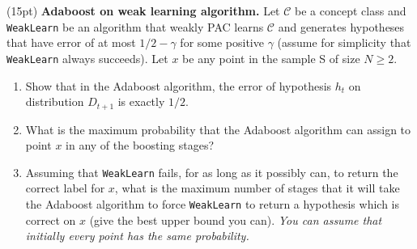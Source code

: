 \documentclass[11pt]{article}
\newcommand*{\C}{{\mathcal C}}
\DeclareMathOperator{\1}{\mathbbm{1}}
\begin{document}

\begin{problem}(15pt) \textbf{Adaboost on weak learning algorithm.}  
Let $\C$ be a concept class and {\tt WeakLearn} be an algorithm that weakly PAC
learns $\C$ and generates hypotheses that have error of at most $1/2-\gamma$
for some positive $\gamma$ (assume for simplicity that {\tt WeakLearn} always
succeeds). Let $x$ be any point in the sample S of size $N \geq 2$.
\begin{enumerate}
\item Show that in the Adaboost algorithm, the error of hypothesis $h_t$ on
distribution $D_{t+1}$ is exactly $1/2.$
\item What is the maximum probability that the Adaboost algorithm can assign to
point $x$ in any of the boosting stages?
\item Assuming  that {\tt WeakLearn} fails, for as long as it possibly can, to
return the correct label for $x$, what is the maximum number of stages that it
will take the Adaboost algorithm to force  {\tt WeakLearn} to return a
hypothesis which is correct on $x$ (give the best upper bound you can). {\em You
can assume that initially every point has the same probability.}
\end{enumerate}
\end{problem}





\end{document}
